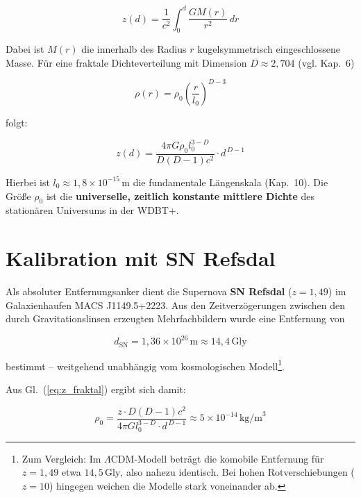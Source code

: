 \documentclass[12pt,a4paper]{article}
\begin{document}
\begin{equation}
z(d) = \frac{1}{c^2} \int_0^d \frac{G M(r)}{r^2} \, dr
\label{eq:z_general}
\end{equation}

Dabei ist $M(r)$ die innerhalb des Radius $r$ kugelsymmetrisch eingeschlossene Masse. Für eine fraktale Dichteverteilung mit Dimension $D \approx 2{,}704$ (vgl. Kap.~6)

\begin{equation}
\rho(r) = \rho_0 \left( \frac{r}{l_0} \right)^{D-3}
\end{equation}

folgt:

\begin{equation}
z(d) = \frac{4\pi G \rho_0 l_0^{3-D}}{D(D-1)c^2} \cdot d^{\,D-1}
\label{eq:z_fraktal}
\end{equation}

Hierbei ist $l_0 \approx 1{,}8 \times 10^{-15}\,\text{m}$ die fundamentale Längenskala (Kap.~10). Die Größe $\rho_0$ ist die \textbf{universelle, zeitlich konstante mittlere Dichte} des stationären Universums in der WDBT+.

\section{Kalibration mit SN Refsdal}

Als absoluter Entfernungsanker dient die Supernova \textbf{SN Refsdal} ($z = 1{,}49$) im Galaxienhaufen MACS J1149.5+2223. Aus den Zeitverzögerungen zwischen den durch Gravitationslinsen erzeugten Mehrfachbildern wurde eine Entfernung von 

\begin{equation}
d_{\text{SN}} = 1{,}36 \times 10^{26}\,\text{m} \approx 14{,}4\,\text{Gly}
\end{equation}

bestimmt – weitgehend unabhängig vom kosmologischen Modell\footnote{Zum Vergleich: Im $\Lambda$CDM-Modell beträgt die komobile Entfernung für $z=1{,}49$ etwa $14{,}5\,\text{Gly}$, also nahezu identisch. Bei hohen Rotverschiebungen ($z=10$) hingegen weichen die Modelle stark voneinander ab.}.

Aus Gl.~(\ref{eq:z_fraktal}) ergibt sich damit:

\begin{equation}
\rho_0 = \frac{z \cdot D(D-1)c^2}{4\pi G l_0^{3-D} \cdot d^{\,D-1}} \approx 5 \times 10^{-14}\,\text{kg/m}^3
\end{equation}
\end{document}
